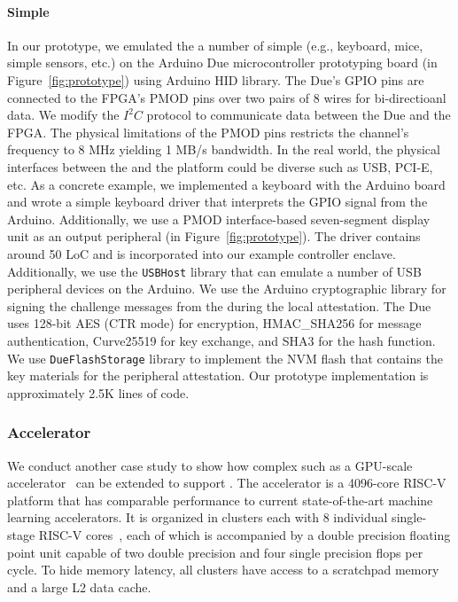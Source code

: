 \paragraph{Simple \sphw}  In our prototype, we emulated the a number of simple \sphw (e.g., keyboard, mice, simple sensors, etc.) on the Arduino Due microcontroller prototyping board (\two in Figure~\ref{fig:prototype}) using Arduino HID library. The Due's GPIO pins are connected to the FPGA's PMOD pins over two pairs of $8$ wires for bi-directioanl data. We modify the $I^2C$ protocol to communicate data between the Due and the FPGA. The physical limitations of the PMOD pins restricts the channel's frequency to $8$ MHz yielding 1 MB/s bandwidth. In the real world, the physical interfaces between the \sphw and the platform could be diverse such as USB, PCI-E, etc. As a concrete example, we implemented a keyboard with the Arduino board and wrote a simple keyboard driver that interprets the GPIO signal from the Arduino. Additionally, we use a PMOD interface-based seven-segment display unit as an output peripheral (\three in Figure~\ref{fig:prototype}). The driver contains around 50 LoC and is incorporated into our example controller enclave. Additionally, we use the \texttt{USBHost} library that can emulate a number of USB peripheral devices on the Arduino. We use the Arduino cryptographic library for signing the challenge messages from the \ce during the local attestation. The Due uses 128-bit AES (CTR mode) for encryption, HMAC\_SHA256 for message authentication, Curve25519 for key exchange, and SHA3 for the hash function. We use \texttt{DueFlashStorage} library to implement the NVM flash that contains the key materials for the peripheral attestation. Our prototype implementation is approximately 2.5K lines of code.

\subsubsection{Accelerator}
\label{sec:eval:accel}

We conduct another case study to show how complex \sphw such as a GPU-scale accelerator~\cite{zaruba2020manticore} can be extended to support \name. The accelerator is a 4096-core RISC-V platform that has comparable performance to current state-of-the-art machine learning accelerators. It is organized in clusters each with 8 individual single-stage RISC-V cores~\cite{zaruba2020snitch}, each of which is accompanied by a double precision floating point unit capable of two double precision and four single precision flops per cycle. To hide memory latency, all clusters have access to a scratchpad memory and a large L2 data cache. 

